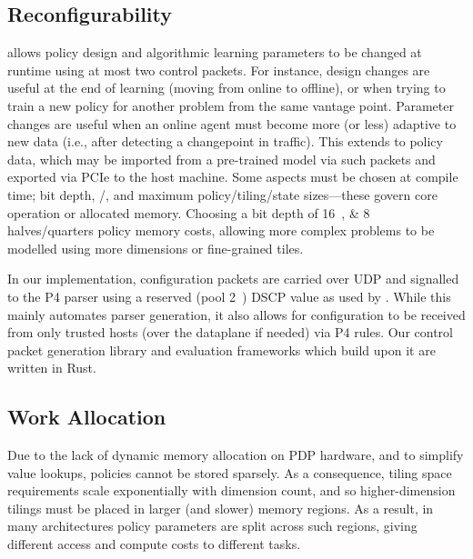 \subsection{Reconfigurability}
\approachshort{} allows policy design and algorithmic learning parameters to be changed at runtime using at most two control packets.
For instance, design changes are useful at the end of learning (moving from online to offline), or when trying to train a new policy for another problem from the same vantage point.
Parameter changes are useful when an online agent must become more (or less) adaptive to new data (i.e., after detecting a changepoint in traffic).
This extends to policy data, which may be imported from a pre-trained model via such packets and exported via PCIe to the host machine.
Some aspects must be chosen at compile time; bit depth, \Coopfw/\Indfw, and maximum policy/tiling/state sizes---these govern core operation or allocated memory.
Choosing a bit depth of \qtylist[list-pair-separator = { or }]{16;8}{\bit} halves/quarters policy memory costs, allowing more complex problems to be modelled using more dimensions or fine-grained tiles.

In our implementation, configuration packets are carried over UDP and signalled to the P4 parser using a reserved (pool 2~\parencite{rfc2474}) DSCP value as used by \textcite{DBLP:conf/isca/LiLYCSH19}.
While this mainly automates parser generation, it also allows for configuration to be received from only trusted hosts (over the dataplane if needed) via P4 rules.
Our control packet generation library and evaluation frameworks which build upon it are written in Rust.


\subsection{Work Allocation}\label{sec:work-allocation}
Due to the lack of dynamic memory allocation on PDP hardware, and to simplify value lookups, policies cannot be stored sparsely.
As a consequence, tiling space requirements scale exponentially with dimension count, and so higher-dimension tilings must be placed in larger (and slower) memory regions.
As a result, in many architectures policy parameters are split across such regions, giving different access and compute costs to different tasks.

